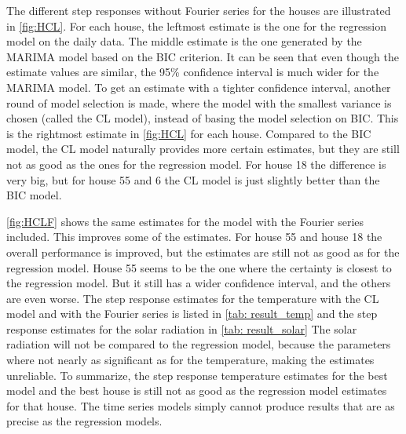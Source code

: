 \noindent The different step responses without Fourier series for the houses are illustrated in \cref{fig:HCL}. For each house, the leftmost estimate is the one for the regression model on the daily data. The middle estimate is the one generated by the MARIMA model based on the BIC criterion. It can be seen that even though the estimate values are similar, the 95\% confidence interval is much wider for the MARIMA model. To get an estimate with a tighter confidence interval, another round of model selection is made, where the model with the smallest variance is chosen (called the CL model), instead of basing the model selection on BIC. This is the rightmost estimate in \cref{fig:HCL} for each house. Compared to the BIC model, the CL model naturally provides more certain estimates, but they are still not as good as the ones for the regression model. For house 18 the difference is very big, but for house 55 and 6 the CL model is just slightly better than the BIC model.

\noindent \cref{fig:HCLF} shows the same estimates for the model with the Fourier series included. This improves some of the estimates. For house 55 and house 18 the overall performance is improved, but the estimates are still not as good as for the regression model. House 55 seems to be the one where the certainty is closest to the regression model. But it still has a wider confidence interval, and the others are even worse. The step response estimates for the temperature with the CL model and with the Fourier series is listed in \cref{tab: result_temp} and the step response estimates for the solar radiation in \cref{tab: result_solar}  The solar radiation will not be compared to the regression model, because the parameters where not nearly as significant as for the temperature, making the estimates unreliable. To summarize, the step response temperature estimates for the best model and the best house is still not as good as the regression model estimates for that house. The time series models simply cannot produce results that are as precise as the regression models.


